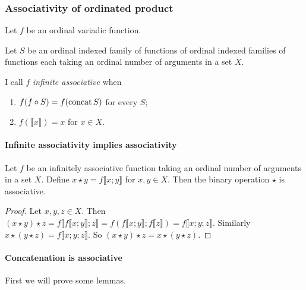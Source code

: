 \subsubsection{Associativity of ordinated product}

Let $f$ be an ordinal variadic function.

Let $S$ be an ordinal indexed family of functions of ordinal indexed
families of functions each taking an ordinal number of arguments in
a set $X$.

I call $f$ \emph{infinite associative}
when
\begin{enumerate}
\item $f(f\circ S)=f(\operatorname{concat} S)$ for every $S$;
\item $f(\llbracket x\rrbracket)=x$ for $x\in X$.
\end{enumerate}

\paragraph{Infinite associativity implies associativity}
\begin{prop}
Let $f$ be an infinitely associative function taking an ordinal number
of arguments in a set $X$. Define $x\star y=f\llbracket x;y\rrbracket$
for $x,y\in X$. Then the binary operation $\star$ is associative.\end{prop}
\begin{proof}
Let $x,y,z\in X$. Then $(x\star y)\star z=f\llbracket f\llbracket x;y\rrbracket;z\rrbracket=f(f\llbracket x;y\rrbracket;f\llbracket z\rrbracket)=f\llbracket x;y;z\rrbracket$.
Similarly $x\star(y\star z)=f\llbracket x;y;z\rrbracket$. So $(x\star y)\star z=x\star(y\star z)$.
\end{proof}

\paragraph{Concatenation is associative}

First we will prove some lemmas.

